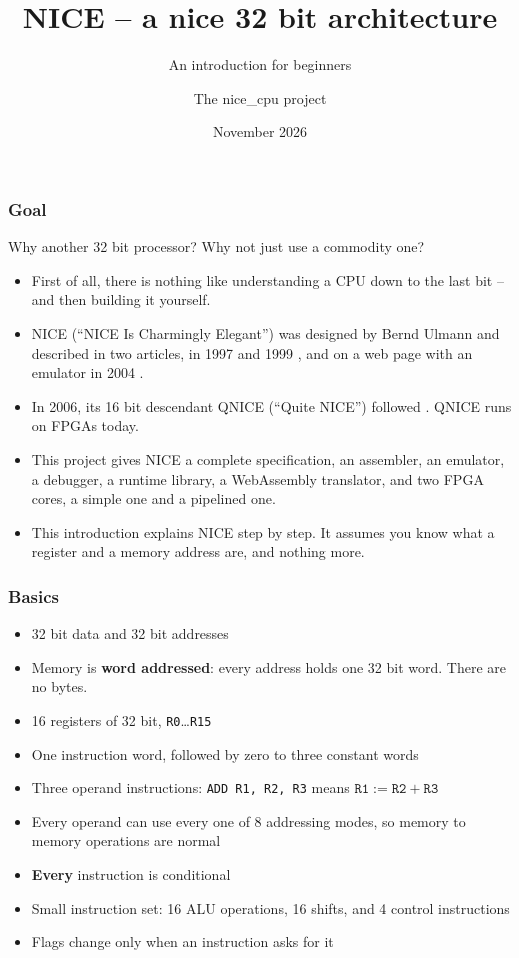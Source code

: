 \documentclass{beamer}
\title[NICE]{NICE -- a nice 32 bit architecture}
\subtitle{An introduction for beginners}
\author[nice\_cpu]{The nice\_cpu project}
\institute[]{The NICE architecture is by Bernd Ulmann}
\date{November 2026}
\newcommand{\code}[1]{\texttt{#1}}
\begin{document}
 \begin{frame}
  \titlepage
 \end{frame}
%
   \begin{frame}
    \frametitle{Goal}
    Why another 32 bit processor? Why not just use a commodity one?
    \begin{itemize}
     \item First of all, there is nothing like understanding a CPU
      down to the last bit -- and then building it yourself.
     \item NICE (``NICE Is Charmingly Elegant'') was designed by
      Bernd Ulmann and described in two articles, in 1997 \cite{nice}
      and 1999 \cite{nice99}, and on a web page with an emulator in 2004
      \cite{nice_html}.
     \item In 2006, its 16 bit descendant QNICE (``Quite NICE'') followed
      \cite{qnice}. QNICE runs on FPGAs today.
     \item This project gives NICE a complete specification, an assembler,
      an emulator, a debugger, a runtime library, a WebAssembly
      translator, and two FPGA cores, a simple one and a pipelined one.
     \item This introduction explains NICE step by step. It assumes you
      know what a register and a memory address are, and nothing more.
    \end{itemize}
   \end{frame}
%
   \begin{frame}
    \frametitle{Basics}
    \begin{itemize}
     \item 32 bit data and 32 bit addresses
     \item Memory is \textbf{word addressed}: every address holds one
      32 bit word. There are no bytes.
     \item 16 registers of 32 bit, \code{R0}\dots\code{R15}
     \item One instruction word, followed by zero to three constant words
     \item Three operand instructions: \code{ADD R1, R2, R3} means
      $\code{R1} := \code{R2} + \code{R3}$
     \item Every operand can use every one of 8 addressing modes, so
      memory to memory operations are normal
     \item \textbf{Every} instruction is conditional
     \item Small instruction set: 16 ALU operations, 16 shifts, and
      4 control instructions
     \item Flags change only when an instruction asks for it
    \end{itemize}
   \end{frame}
\end{document}
